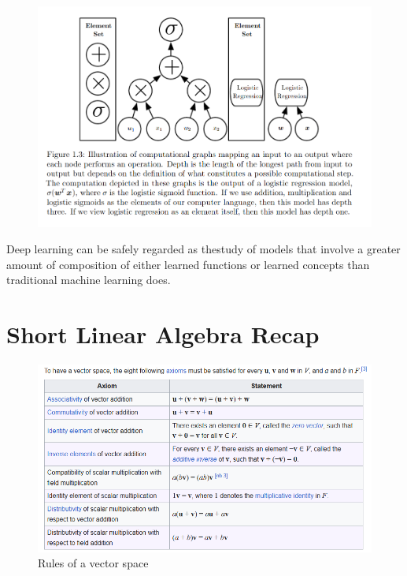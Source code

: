 \documentclass[../Main.tex]{subfiles}
\begin{document}
\begin{figure}[H]
    \centering
    \includegraphics[width=0.75\linewidth]{Images/computational-depth.png}
\end{figure}

Deep learning can be safely regarded as thestudy of models that involve a greater amount of composition 
of either learned functions or learned concepts than traditional machine learning does.

\newpage
\section{Short Linear Algebra Recap}

\begin{figure}[H]
    \centering
    \includegraphics[width=0.75\linewidth]{Images/vector-space.png}
    \caption{Rules of a vector space}
\end{figure}
\end{document}
